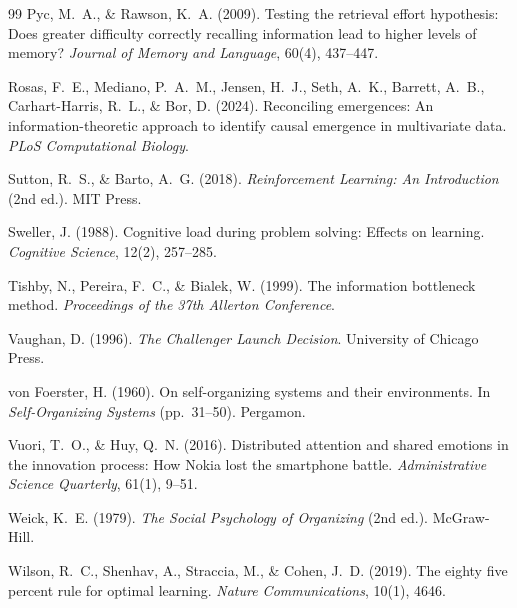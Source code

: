 \documentclass[12pt,letterpaper]{article}
\theoremstyle{definition}
\theoremstyle{remark}
\begin{document}
\begin{thebibliography}{99}
Pyc, M.~A., \& Rawson, K.~A. (2009).
\newblock Testing the retrieval effort hypothesis: Does greater difficulty correctly recalling information lead to higher levels of memory?
\newblock \emph{Journal of Memory and Language}, 60(4), 437--447.

Rosas, F.~E., Mediano, P.~A.~M., Jensen, H.~J., Seth, A.~K., Barrett, A.~B., Carhart-Harris, R.~L., \& Bor, D. (2024).
\newblock Reconciling emergences: An information-theoretic approach to identify causal emergence in multivariate data.
\newblock \emph{PLoS Computational Biology}.

Sutton, R.~S., \& Barto, A.~G. (2018).
\newblock \emph{Reinforcement Learning: An Introduction} (2nd ed.).
\newblock MIT Press.

Sweller, J. (1988).
\newblock Cognitive load during problem solving: Effects on learning.
\newblock \emph{Cognitive Science}, 12(2), 257--285.

Tishby, N., Pereira, F.~C., \& Bialek, W. (1999).
\newblock The information bottleneck method.
\newblock \emph{Proceedings of the 37th Allerton Conference}.

Vaughan, D. (1996).
\newblock \emph{The Challenger Launch Decision}.
\newblock University of Chicago Press.

von Foerster, H. (1960).
\newblock On self-organizing systems and their environments.
\newblock In \emph{Self-Organizing Systems} (pp.~31--50). Pergamon.

Vuori, T.~O., \& Huy, Q.~N. (2016).
\newblock Distributed attention and shared emotions in the innovation process: How Nokia lost the smartphone battle.
\newblock \emph{Administrative Science Quarterly}, 61(1), 9--51.

Weick, K.~E. (1979).
\newblock \emph{The Social Psychology of Organizing} (2nd ed.).
\newblock McGraw-Hill.

Wilson, R.~C., Shenhav, A., Straccia, M., \& Cohen, J.~D. (2019).
\newblock The eighty five percent rule for optimal learning.
\newblock \emph{Nature Communications}, 10(1), 4646.

\end{thebibliography}
\end{document}
